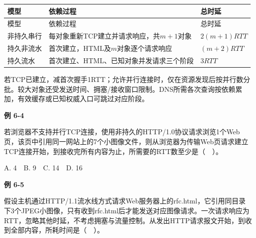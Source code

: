 \par\smallskip
{\fontsize{9.3}{12}\selectfont\setlength{\tabcolsep}{2.5pt}\setlength{\LTleft}{0pt}\setlength{\LTright}{0pt}
\begin{longtable}{@{}>{\raggedright\arraybackslash}p{}>{\raggedright\arraybackslash}p{}>{\raggedright\arraybackslash}p{}@{}}
\toprule
模型 & 依赖过程 & 总时延 \\

\midrule\endfirsthead\toprule
模型 & 依赖过程 & 总时延 \\

\midrule\endhead\bottomrule\endfoot
非持久串行 & 每对象重新TCP建立并请求响应，共\(m+1\)对象 & \(2(m+1)RTT\) \\

持久非流水 & 首次建立，HTML及\(m\)对象逐个请求响应 & \((m+2)RTT\) \\

持久流水 & 首次建立、HTML、已知对象并发请求三个阶段 & \(3RTT\) \\

\end{longtable}}
\par\smallskip

若TCP已建立，减首次握手1RTT；允许并行连接时，仅在资源发现后按并行数分批。较大对象还受发送时间、拥塞/接收窗口限制。DNS所需各次查询按依赖累加，有效缓存或已知权威入口可跳过对应阶段。

\par\medskip{}\noindent\hypertarget{CN06-E04}{}\label{CN06-E04}\textbf{例 6-4}\par\nobreak\smallskip

若浏览器不支持并行TCP连接，使用非持久的HTTP/1.0协议请求浏览1个Web页，该页中引用同一网站上的7个小图像文件，则从浏览器为传输Web页请求建立TCP连接开始，到接收完所有内容为止，所需要的RTT数至少是（　）。

A. 4　B. 9　C. 14　D. 16

\par\medskip{}\noindent\hypertarget{CN06-E05}{}\label{CN06-E05}\textbf{例 6-5}\par\nobreak\smallskip

假设主机通过HTTP/1.1流水线方式请求Web服务器上的rfc.html，它引用同目录下3个JPEG小图像，只有收到rfc.html后才能发送对应图像请求。一次请求响应为RTT，忽略其他时延，不考虑拥塞与流量控制。从发出HTTP请求报文开始，到收到全部内容，所耗时间是（　）。


